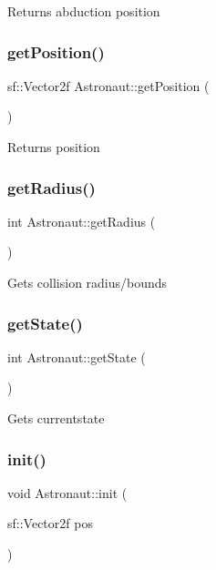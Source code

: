 Returns abduction position \mbox{\label{class_astronaut_a3738ff50527c44f089b110ecdb0be2f3}} 
\subsubsection{\texorpdfstring{get\+Position()}{getPosition()}}
{\footnotesize\ttfamily sf\+::\+Vector2f Astronaut\+::get\+Position (\begin{DoxyParamCaption}{ }\end{DoxyParamCaption})}

Returns position \mbox{\label{class_astronaut_afcf013c7b009a8ef65ab84613eba4000}} 
\subsubsection{\texorpdfstring{get\+Radius()}{getRadius()}}
{\footnotesize\ttfamily int Astronaut\+::get\+Radius (\begin{DoxyParamCaption}{ }\end{DoxyParamCaption})}

Gets collision radius/bounds \mbox{\label{class_astronaut_a6396ab5b07039062ab97666d36bb781a}} 
\subsubsection{\texorpdfstring{get\+State()}{getState()}}
{\footnotesize\ttfamily int Astronaut\+::get\+State (\begin{DoxyParamCaption}{ }\end{DoxyParamCaption})}

Gets currentstate \mbox{\label{class_astronaut_a1f21de93b38b191d9641b8b23bcbbacb}} 
\subsubsection{\texorpdfstring{init()}{init()}}
{\footnotesize\ttfamily void Astronaut\+::init (\begin{DoxyParamCaption}\item[{sf\+::\+Vector2f}]{pos }\end{DoxyParamCaption})}

